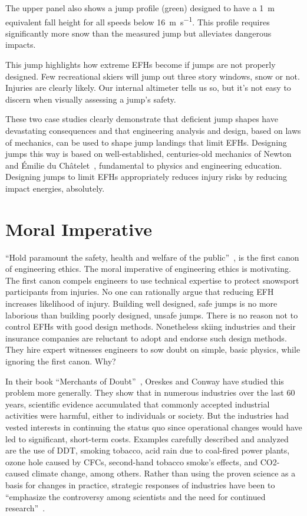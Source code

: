 \documentclass[smallextended]{svjour3}       %
\begin{document}
The upper panel also shows a jump profile (green) designed to have a
1~\si{\meter} equivalent fall height for all speeds below
16~\si{\meter\per\second}. This profile requires significantly more snow than
the measured jump but alleviates dangerous impacts.

This jump highlights how extreme EFHs become if jumps are not properly
designed. Few recreational skiers will jump out three story windows, snow or
not. Injuries are clearly likely.  Our internal altimeter tells us so, but it's
not easy to discern when visually assessing a jump's safety.

These two case studies clearly demonstrate that deficient jump shapes have
devastating consequences and that engineering analysis and design, based on
laws of mechanics, can be used to shape jump landings that limit EFHs.
Designing jumps this way is based on well-established, centuries-old mechanics
of Newton and Émilie du Châtelet~\cite{Zinsser2007}, fundamental to physics and
engineering education. Designing jumps to limit EFHs appropriately reduces
injury risks by reducing impact energies, absolutely.

\section{Moral Imperative}
\label{sec:moral}
%
``Hold paramount the safety, health and welfare of the
public''~\cite{NSPE2019}, is the first canon of engineering ethics. The moral
imperative of engineering ethics is motivating. The first canon compels
engineers to use technical expertise to protect snowsport participants from
injuries. No one can rationally argue that reducing EFH increases likelihood of
injury. Building well designed, safe jumps is no more laborious than building
poorly designed, unsafe jumps. There is no reason not to control EFHs with good
design methods. Nonetheless skiing industries and their insurance companies are
reluctant to adopt and endorse such design methods. They hire expert witnesses
engineers to sow doubt on simple, basic physics, while ignoring the first
canon. Why?

In their book ``Merchants of Doubt''~\cite{Oreskes2010}, Oreskes and Conway
have studied this problem more generally. They show that in numerous industries
over the last 60 years, scientific evidence accumulated that commonly accepted
industrial activities were harmful, either to individuals or society. But the
industries had vested interests in continuing the status quo since operational
changes would have led to significant, short-term costs. Examples carefully
described and analyzed~\cite{Oreskes2010} are the use of DDT, smoking tobacco,
acid rain due to coal-fired power plants, ozone hole caused by CFCs,
second-hand tobacco smoke’s effects, and CO2-caused climate change, among
others. Rather than using the proven science as a basis for changes in
practice, strategic responses of industries have been to ``emphasize the
controversy among scientists and the need for continued
research''~\cite{Oreskes2010}.
\end{document}
